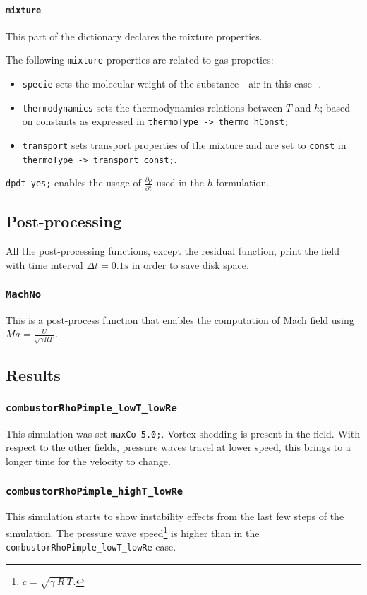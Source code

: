 \cprotect\paragraph{\verb|mixture|}
This part of the dictionary declares the mixture properties. 

The following \verb|mixture| properties are related to gas propeties:
\begin{itemize}
    \item \verb|specie| sets the molecular weight of the substance - air in this case -.
    \item \verb|thermodynamics| sets the thermodynamics relations between $T$ and $h$; based on constants as expressed in \verb|thermoType -> thermo hConst;|
    \item \verb|transport| sets transport properties of the mixture and are set to \verb|const| in \verb|thermoType -> transport const;|.
\end{itemize}

\verb|dpdt yes;| enables the usage of $\frac{\partial p}{\partial t}$ used in the $h$ formulation. 

\subsection{Post-processing}
All the post-processing functions, except the residual function, print the field with time interval $\Delta t = 0.1 s$ in order to save disk space. 
\cprotect\subsubsection{\verb|MachNo|}
This is a post-process function that enables the computation of Mach field using $Ma = \frac{U}{\sqrt{\gamma R T }}$. 

\subsection{Results}    
\cprotect\subsubsection{\verb|combustorRhoPimple_lowT_lowRe|}
This simulation was set \verb|maxCo 5.0;|. Vortex shedding is present in the field. With respect to the other fields, pressure waves travel at lower speed, this brings to a longer time for the velocity to change.   

\cprotect\subsubsection{\verb|combustorRhoPimple_highT_lowRe|}
This simulation starts to show instability effects from the last few steps of the simulation. The pressure wave speed\footnote{$c = \sqrt{\gamma \ R \ T}$.} is higher than in the \verb|combustorRhoPimple_lowT_lowRe| case.

